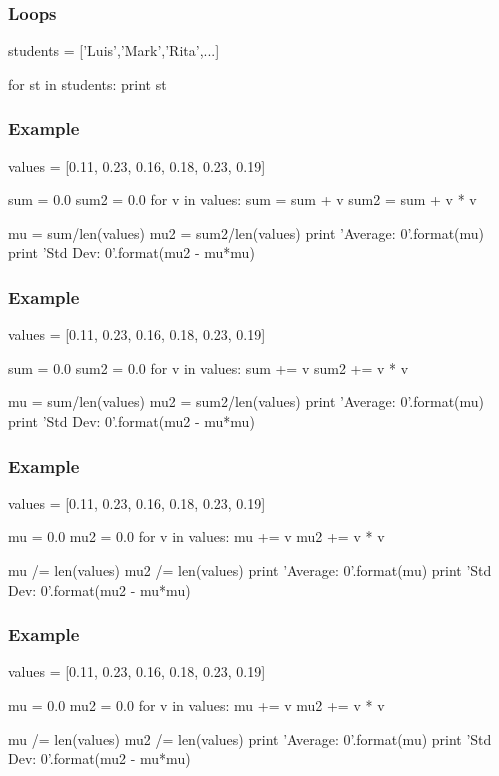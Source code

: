 \begin{frame}[fragile]
\frametitle{Loops}

\begin{python}
students = ['Luis','Mark','Rita',...]

for st in students:
    print st
\end{python}
\end{frame}

\begin{frame}[fragile]
\frametitle{Example}

\begin{python}
values = [0.11, 0.23, 0.16, 0.18, 0.23, 0.19]

sum = 0.0
sum2 = 0.0
for v in values:
    sum = sum + v
    sum2 = sum + v * v

mu = sum/len(values)
mu2 = sum2/len(values)
print 'Average: {0}'.format(mu)
print 'Std Dev: {0}'.format(mu2 - mu*mu)
\end{python}
\end{frame}

\begin{frame}[fragile]
\frametitle{Example}

\begin{python}
values = [0.11, 0.23, 0.16, 0.18, 0.23, 0.19]

sum = 0.0
sum2 = 0.0
for v in values:
    sum += v
    sum2 += v * v

mu = sum/len(values)
mu2 = sum2/len(values)
print 'Average: {0}'.format(mu)
print 'Std Dev: {0}'.format(mu2 - mu*mu)
\end{python}
\end{frame}

\begin{frame}[fragile]
\frametitle{Example}

\begin{python}
values = [0.11, 0.23, 0.16, 0.18, 0.23, 0.19]

mu = 0.0
mu2 = 0.0
for v in values:
    mu += v
    mu2 += v * v

mu /= len(values)
mu2 /= len(values)
print 'Average: {0}'.format(mu)
print 'Std Dev: {0}'.format(mu2 - mu*mu)
\end{python}
\end{frame}

\begin{frame}[fragile]
\frametitle{Example}

\begin{python}
values = [0.11, 0.23, 0.16, 0.18, 0.23, 0.19]

mu = 0.0
mu2 = 0.0
for v in values:
    mu += v
    mu2 += v * v

mu /= len(values)
mu2 /= len(values)
print 'Average: {0}'.format(mu)
print 'Std Dev: {0}'.format(mu2 - mu*mu)
\end{python}
\end{frame}


